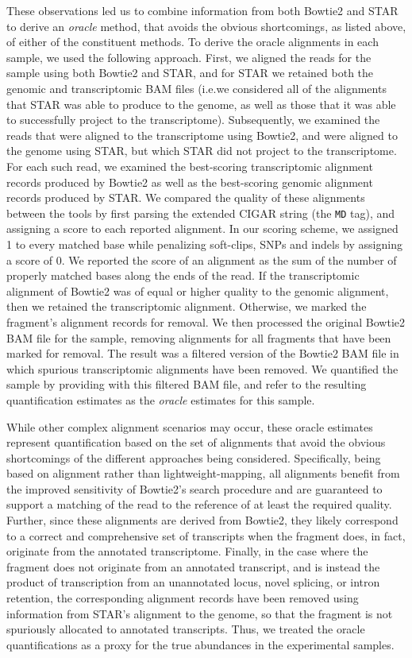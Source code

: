 These observations led us to combine information from both
  Bowtie2 and STAR to derive an \emph{oracle} method, that avoids the obvious
  shortcomings, as listed above, of either of the constituent methods. To derive
  the oracle alignments in each sample, we used the following approach. First, we
  aligned the reads for the sample using both Bowtie2 and STAR, and for STAR we
  retained both the genomic and transcriptomic BAM files (i.e.\@ we considered all of
  the alignments that STAR was able to produce to the genome, as well as those
  that it was able to successfully project to the transcriptome). Subsequently,
  we examined the reads that were aligned to the transcriptome using Bowtie2, and
  were aligned to the genome using STAR, but which STAR did not project to the
  transcriptome. For each such read, we examined the best-scoring transcriptomic
  alignment records produced by Bowtie2 as well as the best-scoring genomic
  alignment records produced by STAR. We compared the quality of these alignments
  between the tools by first parsing the extended CIGAR string (the \texttt{MD}
  tag), and assigning a score to each reported alignment. In our
  scoring scheme, we assigned 1 to every matched base while penalizing soft-clips,
  SNPs and indels by assigning a score of 0. We reported the score of an alignment
  as the sum of the number of properly matched bases along the ends of the read.
  If the transcriptomic alignment of Bowtie2 was of equal or higher quality to
  the genomic alignment, then we retained the transcriptomic alignment. Otherwise,
  we marked the fragment's alignment records for removal. We then processed the
  original Bowtie2 BAM file for the sample, removing alignments for all
  fragments that have been marked for removal. The result was a filtered version
  of the Bowtie2 BAM file in which spurious transcriptomic alignments have been
  removed. We quantified the sample by providing \salmon with this filtered BAM
  file, and refer to the resulting quantification estimates as the
  \emph{oracle} estimates for this sample.

While other complex alignment scenarios may occur, these oracle
  estimates represent quantification based on the set of alignments that avoid
  the obvious shortcomings of the different approaches being considered.
  Specifically, being based on alignment rather than lightweight-mapping, all
  alignments benefit from the improved sensitivity of Bowtie2's search procedure
  and are guaranteed to support a matching of the read to the reference of at
  least the required quality. Further, since these alignments are derived from
  Bowtie2, they likely correspond to a correct and comprehensive set of
  transcripts when the fragment does, in fact, originate from the annotated
  transcriptome. Finally, in the case where the fragment does not originate from
  an annotated transcript, and is instead the product of transcription from an
  unannotated locus, novel splicing, or intron retention, the corresponding
  alignment records have been removed using information from STAR's alignment 
  to the genome, so that the fragment is not spuriously
  allocated to annotated transcripts. Thus, we treated the oracle quantifications
  as a proxy for the true abundances in the experimental samples.

